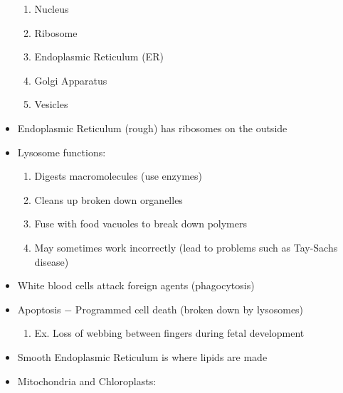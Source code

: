 \documentclass[12pt]{article}
\begin{document}
\begin{itemize}
    \begin{enumerate}

      \item Nucleus

      \item Ribosome

      \item Endoplasmic Reticulum (ER)

      \item Golgi Apparatus

      \item Vesicles

    \end{enumerate}

  \item Endoplasmic Reticulum (rough) has ribosomes on the outside

  \item Lysosome functions:

    \begin{enumerate}

      \item Digests macromolecules (use enzymes)

      \item Cleans up broken down organelles

      \item Fuse with food vacuoles to break down polymers

      \item May sometimes work incorrectly (lead to problems such as Tay-Sachs disease)

    \end{enumerate}

  \item White blood cells attack foreign agents (phagocytosis)

  \item Apoptosis $-$ Programmed cell death (broken down by lysosomes)

    \begin{enumerate}

      \item Ex. Loss of webbing between fingers during fetal development

    \end{enumerate}

  \item Smooth Endoplasmic Reticulum is where lipids are made

  \item Mitochondria and Chloroplasts:


\end{itemize}
\end{document}
